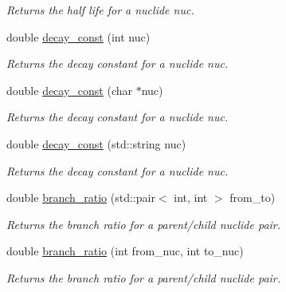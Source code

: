 \begin{DoxyCompactItemize}
\begin{DoxyCompactList}\small\item\em Returns the half life for a nuclide {\itshape nuc}. \end{DoxyCompactList}\item 
double \hyperlink{namespacepyne_a6b87e11fea0c2167cd19eb62c21b12b2}{decay\+\_\+const} (int nuc)
\begin{DoxyCompactList}\small\item\em Returns the decay constant for a nuclide {\itshape nuc}. \end{DoxyCompactList}\item 
\mbox{\label{namespacepyne_a4160d26376d4c3ea12636fd33ca8b3bb}} 
double \hyperlink{namespacepyne_a4160d26376d4c3ea12636fd33ca8b3bb}{decay\+\_\+const} (char $\ast$nuc)
\begin{DoxyCompactList}\small\item\em Returns the decay constant for a nuclide {\itshape nuc}. \end{DoxyCompactList}\item 
\mbox{\label{namespacepyne_a8c3dd2b8fd7565d17301e39f6b959b92}} 
double \hyperlink{namespacepyne_a8c3dd2b8fd7565d17301e39f6b959b92}{decay\+\_\+const} (std\+::string nuc)
\begin{DoxyCompactList}\small\item\em Returns the decay constant for a nuclide {\itshape nuc}. \end{DoxyCompactList}\item 
double \hyperlink{namespacepyne_af619eaa83237b583dd7f3b5c6b41a618}{branch\+\_\+ratio} (std\+::pair$<$ int, int $>$ from\+\_\+to)
\begin{DoxyCompactList}\small\item\em Returns the branch ratio for a parent/child nuclide pair. \end{DoxyCompactList}\item 
\mbox{\label{namespacepyne_af2ac244d00d6a8fab26e646eb53fd172}} 
double \hyperlink{namespacepyne_af2ac244d00d6a8fab26e646eb53fd172}{branch\+\_\+ratio} (int from\+\_\+nuc, int to\+\_\+nuc)
\begin{DoxyCompactList}\small\item\em Returns the branch ratio for a parent/child nuclide pair. \end{DoxyCompactList}\item 

\end{DoxyCompactItemize}
